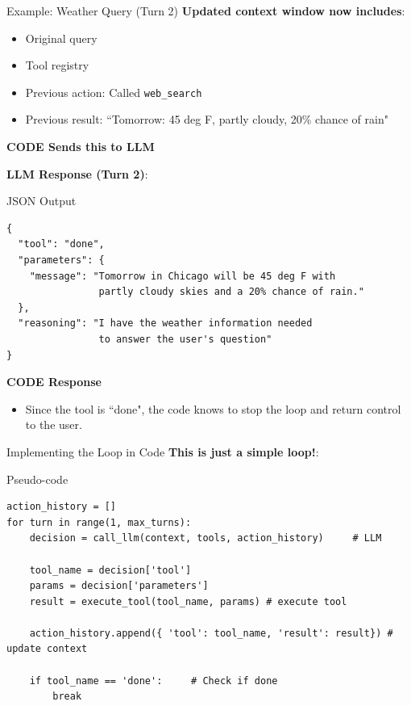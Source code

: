 \documentclass[aspectratio=169]{beamer}
\begin{document}
\begin{frame}{Example: Weather Query (Turn 2)}
\textbf{Updated context window now includes}:
\begin{itemize}
    \item Original query
    \item Tool registry
    \item Previous action: Called \texttt{web\_search}
    \item Previous result: ``Tomorrow: 45 deg F, partly cloudy, 20\% chance of rain"
\end{itemize}
\vspace{0.3cm}
	\textbf{CODE Sends this to LLM}
\end{frame}

\begin{frame}[fragile]
	\textbf{LLM Response (Turn 2)}:
\begin{block}{JSON Output}

\begin{verbatim}
{
  "tool": "done",
  "parameters": {
    "message": "Tomorrow in Chicago will be 45 deg F with
                partly cloudy skies and a 20% chance of rain."
  },
  "reasoning": "I have the weather information needed
                to answer the user's question"
}
\end{verbatim}

\end{block}

\end{frame}

\begin{frame}[fragile]
	\textbf{CODE Response}

\begin{itemize}
	\item Since the tool is ``done", the code knows to stop the loop and return control to the user.
\end{itemize}
\end{frame}


\begin{frame}[fragile]{Implementing the Loop in Code}
\textbf{This is just a simple loop!}:
\vspace{0.2cm}

\begin{block}{Pseudo-code}
{\small
\begin{verbatim}
action_history = []
for turn in range(1, max_turns):
    decision = call_llm(context, tools, action_history)     # LLM 

    tool_name = decision['tool']
    params = decision['parameters']
    result = execute_tool(tool_name, params) # execute tool

    action_history.append({ 'tool': tool_name, 'result': result}) # update context

    if tool_name == 'done':     # Check if done
        break
\end{verbatim}
}
\end{block}
\end{frame}
\end{document}
